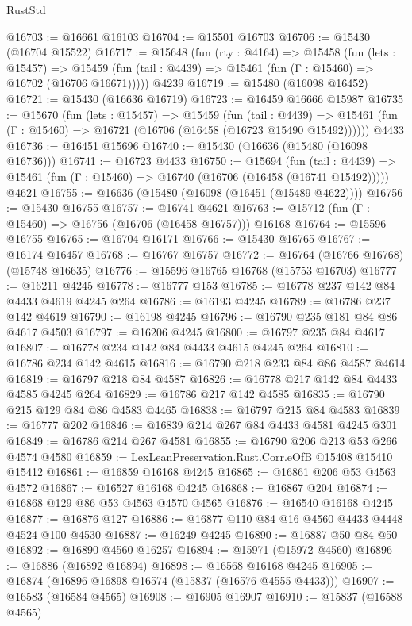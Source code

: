 \begin{lexlean}{RustStd}
\begin{coremodule}
{\begin{coremodule}
{{{{{{{{{{{{{{{{{{{{{{{{{{{{{{{{{{{{{{{{{{{{{{{{{{{{{{{{{{{{@16703 := @16661 @16103
@16704 := @15501 @16703
@16706 := @15430 (@16704 @15522)
@16717 := @15648
    (fun (rty : @4164) =>
    @15458
      (fun (lets : @15457) =>
      @15459 (fun (tail : @4439) => @15461 (fun (Γ : @15460) => @16702 (@16706 @16671)))))
    @4239
@16719 := @15480 (@16098 @16452)
@16721 := @15430 (@16636 @16719)
@16723 := @16459 @16666 @15987
@16735 := @15670
    (fun (lets : @15457) =>
    @15459
      (fun (tail : @4439) =>
      @15461 (fun (Γ : @15460) => @16721 (@16706 (@16458 (@16723 @15490 @15492))))))
    @4433
@16736 := @16451 @15696
@16740 := @15430 (@16636 (@15480 (@16098 @16736)))
@16741 := @16723 @4433
@16750 := @15694
    (fun (tail : @4439) => @15461 (fun (Γ : @15460) => @16740 (@16706 (@16458 (@16741 @15492)))))
    @4621
@16755 := @16636 (@15480 (@16098 (@16451 (@15489 @4622))))
@16756 := @15430 @16755
@16757 := @16741 @4621
@16763 := @15712 (fun (Γ : @15460) => @16756 (@16706 (@16458 @16757))) @16168
@16764 := @15596 @16755
@16765 := @16704 @16171
@16766 := @15430 @16765
@16767 := @16174 @16457
@16768 := @16767 @16757
@16772 := @16764 (@16766 @16768) (@15748 @16635)
@16776 := @15596 @16765 @16768 (@15753 @16703)
@16777 := @16211 @4245
@16778 := @16777 @153
@16785 := @16778 @237 @142 @84 @4433 @4619 @4245 @264
@16786 := @16193 @4245
@16789 := @16786 @237 @142 @4619
@16790 := @16198 @4245
@16796 := @16790 @235 @181 @84 @86 @4617 @4503
@16797 := @16206 @4245
@16800 := @16797 @235 @84 @4617
@16807 := @16778 @234 @142 @84 @4433 @4615 @4245 @264
@16810 := @16786 @234 @142 @4615
@16816 := @16790 @218 @233 @84 @86 @4587 @4614
@16819 := @16797 @218 @84 @4587
@16826 := @16778 @217 @142 @84 @4433 @4585 @4245 @264
@16829 := @16786 @217 @142 @4585
@16835 := @16790 @215 @129 @84 @86 @4583 @4465
@16838 := @16797 @215 @84 @4583
@16839 := @16777 @202
@16846 := @16839 @214 @267 @84 @4433 @4581 @4245 @301
@16849 := @16786 @214 @267 @4581
@16855 := @16790 @206 @213 @53 @266 @4574 @4580
@16859 := LexLeanPreservation.Rust.Corr.eOfB @15408 @15410 @15412
@16861 := @16859 @16168 @4245
@16865 := @16861 @206 @53 @4563 @4572
@16867 := @16527 @16168 @4245
@16868 := @16867 @204
@16874 := @16868 @129 @86 @53 @4563 @4570 @4565
@16876 := @16540 @16168 @4245
@16877 := @16876 @127
@16886 := @16877 @110 @84 @16 @4560 @4433 @4448 @4524 @100 @4530
@16887 := @16249 @4245
@16890 := @16887 @50 @84 @50
@16892 := @16890 @4560 @16257
@16894 := @15971 (@15972 @4560)
@16896 := @16886 (@16892 @16894)
@16898 := @16568 @16168 @4245
@16905 := @16874 (@16896 @16898 @16574 (@15837 (@16576 @4555 @4433)))
@16907 := @16583 (@16584 @4565)
@16908 := @16905 @16907
@16910 := @15837 (@16588 @4565)
}}}}}}}}}}}}}}}}}}}}}}}}}}}}}}}}}}}}}}}}}}}}}}}}}}}}}}}}}}}}
\end{coremodule}}
\end{coremodule}
\end{lexlean}
